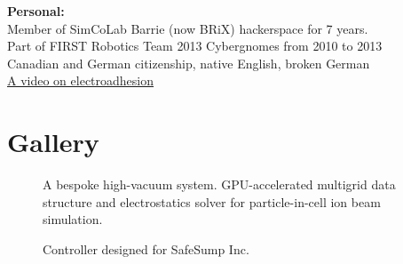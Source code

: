 \documentclass[fleqn,11pt]{article}
\begin{document}
%
\begin{tcolorbox}
	\textbf{Personal:\\}
	Member of SimCoLab Barrie (now BRiX) hackerspace for 7 years.\\
	Part of FIRST Robotics Team 2013 Cybergnomes from 2010 to 2013\\
	Canadian and German citizenship, native English, broken German\\
	\href{https://www.youtube.com/watch?v=TQFxafFIoNM}{A video on electroadhesion}
\end{tcolorbox}
%




\clearpage

\section{Gallery}
\begin{figure}[H]
	\centering
	\caption*{A bespoke high-vacuum system. GPU-accelerated multigrid data structure and electrostatics solver for particle-in-cell ion beam simulation.}
	\hfill
	
\end{figure}



\begin{figure}[H]
	\centering
	\caption*{Controller designed for SafeSump Inc.}
	\hfill
	
\end{figure}
\end{document}
